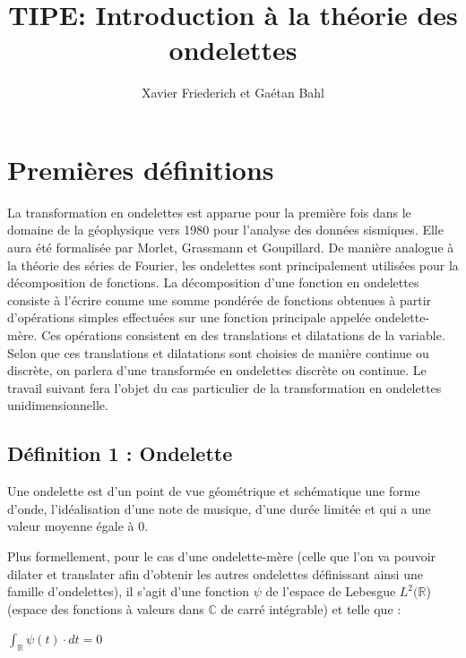 \documentclass{article}
\title{TIPE: Introduction à la théorie des ondelettes}
\author{Xavier Friederich et Gaétan Bahl}
\begin{document}
\maketitle
\tableofcontents
\listoffigures
{}
\clearpage

\newcommand{\fonction}[5]{\begin{array}{l|rcl}
#1: & #2 & \longrightarrow & #3 \\
    & #4 & \longmapsto & #5 \end{array}}

\section{Premières définitions}


La transformation en ondelettes est apparue pour la première fois dans le domaine de la géophysique vers 1980 pour l’analyse des données sismiques. Elle aura été formalisée par Morlet, Grassmann et Goupillard.
De manière analogue à la théorie des séries de Fourier, les ondelettes sont principalement utilisées pour la décomposition de fonctions. La décomposition d’une fonction en ondelettes consiste à l’écrire comme une somme pondérée de fonctions obtenues à partir d’opérations simples effectuées sur une fonction principale appelée ondelette-mère. Ces opérations consistent en des translations et dilatations de la variable. Selon que ces translations et dilatations sont choisies de manière continue ou discrète, on parlera d’une transformée en ondelettes discrète ou continue.
Le travail suivant fera l’objet du cas particulier de la transformation en ondelettes unidimensionnelle.


\subsection{Définition 1 : Ondelette}

Une ondelette est d’un point de vue géométrique et schématique une forme d’onde, l’idéalisation d’une note de musique, d’une durée limitée et qui a une valeur moyenne égale à 0. 

Plus formellement, pour le cas d’une ondelette-mère (celle que l’on va pouvoir dilater et translater afin d’obtenir les autres ondelettes définissant ainsi une famille d’ondelettes), il s’agit d’une fonction $\psi$ de l'espace de Lebesgue $L^2(\mathbb{R}$) (espace des fonctions à valeurs dans $\mathbb{C}$ de carré intégrable) et telle que :

$\int_{\mathbb{R}}\psi{}(t)\cdot{}dt = 0$
\end{document}
